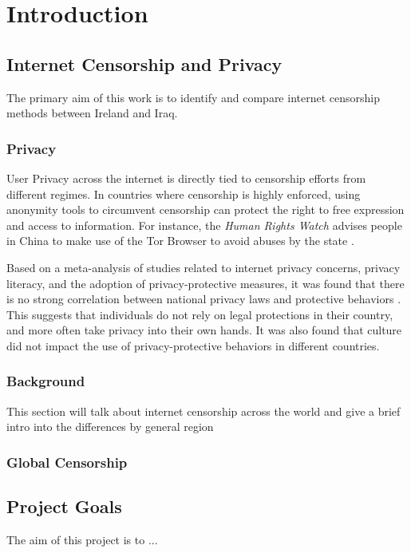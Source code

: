 \chapter{Introduction}

\section{Internet Censorship and Privacy}

The primary aim of this work is to identify and compare internet censorship methods between Ireland and Iraq. 

\subsection{Privacy}

User Privacy across the internet is directly tied to censorship efforts from different regimes. In countries where censorship is highly enforced, using anonymity tools to circumvent censorship can protect the right to free expression and access to information. For instance, the \textit{Human Rights Watch} advises people in China to make use of the Tor Browser to avoid abuses by the state \cite{Privacy2017}. 

Based on a meta-analysis of studies related to internet privacy concerns, privacy literacy, and the adoption of privacy-protective measures, it was found that there is no strong correlation between national privacy laws and protective behaviors \cite{baruh2017online}. This suggests that individuals do not rely on legal protections in their country, and more often take privacy into their own hands. It was also found that culture did not impact the use of privacy-protective behaviors in different countries. 

\subsection{Background}

This section will talk about internet censorship across the world and give a brief intro into the differences by general region

\subsection{Global Censorship}

\section{Project Goals}

The aim of this project is to ...



